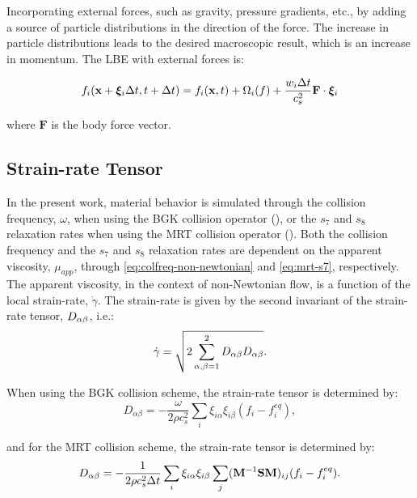 Incorporating external forces, such as gravity, pressure gradients, etc., \DIFdelbegin {}\DIFdelend \DIFaddbegin {}\DIFaddend by adding a source of particle distributions in the direction of the force.
The increase in particle distributions leads to the desired macroscopic result, which is an increase in momentum.
The LBE with external forces is:

\begin{equation}
f_i(\mathbf{x} + \boldsymbol{\xi}_i \Delta t, t + \Delta t) = f_i(\mathbf{x}, t) + \Omega_i(f) + \frac{w_i \Delta t}{c_s^2} \mathbf{F} \cdot \boldsymbol{\xi}_i
\end{equation}

\noindent where $\mathbf{F}$ is the body force vector.

\subsection{Strain-rate Tensor}

In the present work, material behavior is simulated through the collision frequency, $\omega$, when using the BGK collision operator (), or the $s_7$ and $s_8$ relaxation rates when using the MRT collision operator ().
Both the collision frequency and the $s_7$ and $s_8$ relaxation rates are dependent on the apparent viscosity, $\mu_{app}$, through \eqref{eq:colfreq-non-newtonian} and \eqref{eq:mrt-s7}, respectively.
The apparent viscosity, in the context of non-Newtonian flow, is a function of the local strain-rate, $\dot{\gamma}$.
The strain-rate is given by the second invariant of the strain-rate tensor, $D_{\alpha\beta}$, i.e.:
\begin{equation} \label{eq:second-invariant}
\dot{\gamma} = \sqrt{2 \sum_{\alpha,\beta=1}^{2} D_{\alpha\beta} D_{\alpha\beta}}.
\end{equation}

\noindent When using the BGK collision scheme, the strain-rate tensor is determined by:
\begin{equation} \label{eq:srtensor-bgk}
D_{\alpha \beta} = -\frac{\omega}{2 \rho c_s^2} \sum_i \xi_{i \alpha} \xi_{i \beta} (f_i - f^{eq}_i),
\end{equation}

\noindent and for the MRT collision scheme, the strain-rate tensor is determined by:
\begin{equation} \label{eq:srtensor-mrt}
D_{\alpha \beta} = -\frac{1}{2 \rho c_s^2 \Delta t} \sum_i \xi_{i \alpha} \xi_{i \beta} \sum_j (\mathbf{M}^{-1} \mathbf{S} \mathbf{M})_{ij}(f_i - f^{eq}_i).
\end{equation}

